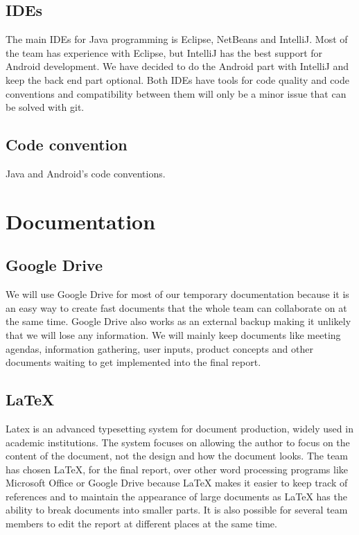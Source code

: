 \subsection{IDEs}
The main IDEs for Java programming is Eclipse, NetBeans and IntelliJ. Most of the team has experience with Eclipse, but IntelliJ has the best support for Android development.
We have decided to do the Android part with IntelliJ and keep the back end part optional. Both IDEs have tools for code quality and code conventions and compatibility between them will only be a minor issue that can be solved with git.

\subsection{Code convention}
Java and Android's code conventions.

\section{Documentation}

\subsection{Google Drive}
We will use Google Drive for most of our temporary documentation because it is an easy way to create fast documents that the whole team can collaborate on at the same time. Google Drive also works as an external backup making it unlikely that we will lose any information. We will mainly keep documents like meeting agendas, information gathering, user inputs, product concepts and other documents waiting to get implemented into the final report.

\subsection{LaTeX}
Latex is an advanced typesetting system for document production, widely used in
academic institutions. The system focuses on allowing the author to focus on the content of the document, not the design and how the document looks.
The team has chosen LaTeX, for the final report, over other word processing programs like Microsoft Office or Google Drive because LaTeX makes it easier to keep track of references and to maintain the appearance of large documents as LaTeX has the ability to break documents into smaller parts. It is also possible for several team members to edit the report at different places at the same time.


